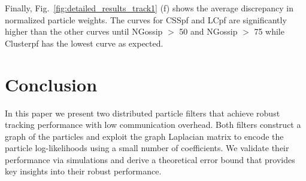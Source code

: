 \documentclass[10pt,letterpaper,final]{article}
\begin{document}
Finally, Fig.~\ref{fig:detailed_results_track1} (f) shows the average discrepancy in normalized particle weights. The curves for CSSpf and LCpf are significantly higher than the other curves until NGossip $>$ 50 and NGossip $>$ 75 while Clusterpf has the lowest curve as expected. 





\section{Conclusion}
In this paper we present two distributed particle filters that achieve robust tracking performance with low communication overhead. Both filters construct a graph of the particles and exploit the graph Laplacian matrix to encode the particle log-likelihoods using a small number of coefficients. We validate their performance via simulations and derive a theoretical error bound that provides key insights into their robust performance. 



\end{document}
